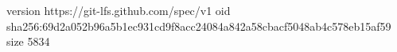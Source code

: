 version https://git-lfs.github.com/spec/v1
oid sha256:69d2a052b96a5b1ec931cd9f8acc24084a842a58cbacf5048ab4c578eb15af59
size 5834
